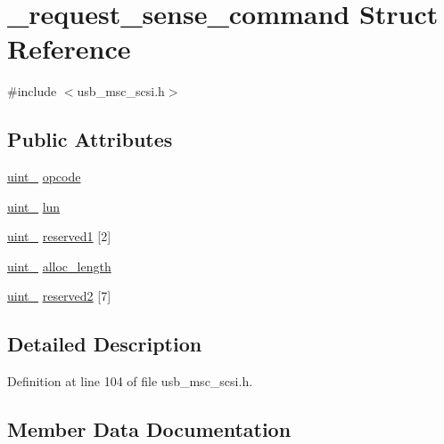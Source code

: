 \hypertarget{struct__request__sense__command}{}\section{\+\_\+request\+\_\+sense\+\_\+command Struct Reference}
\label{struct__request__sense__command}


{\ttfamily \#include $<$usb\+\_\+msc\+\_\+scsi.\+h$>$}

\subsection*{Public Attributes}
\begin{DoxyCompactItemize}
\item 
\hyperlink{types_8h_ad3209046c23f739a81581c10a4be7d92}{uint\+\_} \hyperlink{struct__request__sense__command_ade05b660b81d65777a966c1c4ed39197}{opcode}
\item 
\hyperlink{types_8h_ad3209046c23f739a81581c10a4be7d92}{uint\+\_} \hyperlink{struct__request__sense__command_aaaf6819df56a403fa0019bc42e9ac879}{lun}
\item 
\hyperlink{types_8h_ad3209046c23f739a81581c10a4be7d92}{uint\+\_} \hyperlink{struct__request__sense__command_a8921439cc33219ed7869defdca0ce7e6}{reserved1} \mbox{[}2\mbox{]}
\item 
\hyperlink{types_8h_ad3209046c23f739a81581c10a4be7d92}{uint\+\_} \hyperlink{struct__request__sense__command_a2ff1f279766606fce953063ffbfad20f}{alloc\+\_\+length}
\item 
\hyperlink{types_8h_ad3209046c23f739a81581c10a4be7d92}{uint\+\_} \hyperlink{struct__request__sense__command_afd61266c467e88cc5d23eeccd6437f73}{reserved2} \mbox{[}7\mbox{]}
\end{DoxyCompactItemize}


\subsection{Detailed Description}


Definition at line 104 of file usb\+\_\+msc\+\_\+scsi.\+h.



\subsection{Member Data Documentation}
